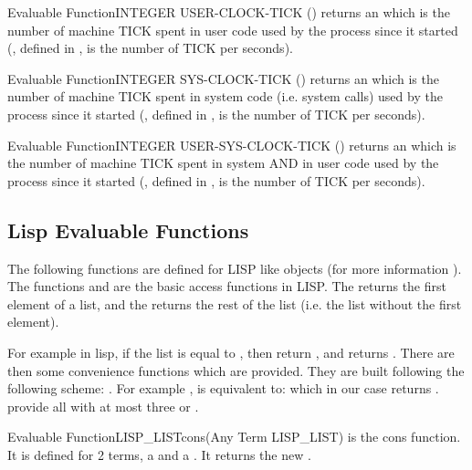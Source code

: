 \begin{typeefa}{Evaluable Function}{INTEGER} {USER-CLOCK-TICK} {()}
returns an  which is the number of machine TICK spent in user
code used by the \COPRS{} process since it started (, defined in
, is the number of TICK per seconds).
\end{typeefa}

\begin{typeefa}{Evaluable Function}{INTEGER} {SYS-CLOCK-TICK} {()}
returns an  which is the number of machine TICK spent in system
code (i.e. system calls) used by the \COPRS{} process since it started
(, defined in , is the number of TICK per seconds).
\end{typeefa}

\begin{typeefa}{Evaluable Function}{INTEGER} {USER-SYS-CLOCK-TICK} {()}
returns an  which is the number of machine TICK spent in system
AND in user code used by the \COPRS{} process since it started (,
defined in , is the number of TICK per seconds).
\end{typeefa}

\subsection{Lisp Evaluable Functions}

The following functions are defined for LISP like objects (for more information
). The functions  and 
are  the basic access functions in LISP. The  returns the first
element of a list, and the  returns the rest of the list (i.e. the
list without the first element).

For example in lisp, if the list  is equal to , then
 return , and  returns . There
are then some convenience functions which are provided. They are built following
the following scheme: . For example , is
equivalent to:  which in our case returns .
\COPRS{} provide all  with at most three  or .

\begin{typeefa}{Evaluable Function}{LISP\_LIST}{cons}{(Any Term LISP\_LIST)}
is the cons function. It is defined for 2 terms, a  and a
.  It returns the new .
\end{typeefa}

